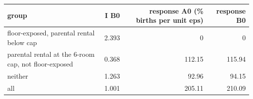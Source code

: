 \begin{tabular}{lrrr}
\toprule
group & I B0 & response A0 (\% births per unit eps) & response B0 \\
\midrule
floor-exposed, parental rental below cap & 2.393 & 0 & 0 \\
parental rental at the 6-room cap, not floor-exposed & 0.368 & 112.15 & 115.94 \\
neither & 1.263 & 92.96 & 94.15 \\
all & 1.001 & 205.11 & 210.09 \\
\bottomrule
\end{tabular}
